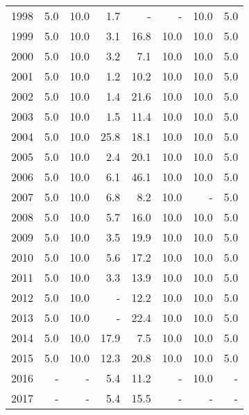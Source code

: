 \begin{longtable}{lrrrrrrr}
  1998 & 5.0 & 10.0 & 1.7 & - & - & 10.0 & 5.0 \\ 
  1999 & 5.0 & 10.0 & 3.1 & 16.8 & 10.0 & 10.0 & 5.0 \\ 
  2000 & 5.0 & 10.0 & 3.2 & 7.1 & 10.0 & 10.0 & 5.0 \\ 
  2001 & 5.0 & 10.0 & 1.2 & 10.2 & 10.0 & 10.0 & 5.0 \\ 
  2002 & 5.0 & 10.0 & 1.4 & 21.6 & 10.0 & 10.0 & 5.0 \\ 
  2003 & 5.0 & 10.0 & 1.5 & 11.4 & 10.0 & 10.0 & 5.0 \\ 
  2004 & 5.0 & 10.0 & 25.8 & 18.1 & 10.0 & 10.0 & 5.0 \\ 
  2005 & 5.0 & 10.0 & 2.4 & 20.1 & 10.0 & 10.0 & 5.0 \\ 
  2006 & 5.0 & 10.0 & 6.1 & 46.1 & 10.0 & 10.0 & 5.0 \\ 
  2007 & 5.0 & 10.0 & 6.8 & 8.2 & 10.0 & - & 5.0 \\ 
  2008 & 5.0 & 10.0 & 5.7 & 16.0 & 10.0 & 10.0 & 5.0 \\ 
  2009 & 5.0 & 10.0 & 3.5 & 19.9 & 10.0 & 10.0 & 5.0 \\ 
  2010 & 5.0 & 10.0 & 5.6 & 17.2 & 10.0 & 10.0 & 5.0 \\ 
  2011 & 5.0 & 10.0 & 3.3 & 13.9 & 10.0 & 10.0 & 5.0 \\ 
  2012 & 5.0 & 10.0 & - & 12.2 & 10.0 & 10.0 & 5.0 \\ 
  2013 & 5.0 & 10.0 & - & 22.4 & 10.0 & 10.0 & 5.0 \\ 
  2014 & 5.0 & 10.0 & 17.9 & 7.5 & 10.0 & 10.0 & 5.0 \\ 
  2015 & 5.0 & 10.0 & 12.3 & 20.8 & 10.0 & 10.0 & 5.0 \\ 
  2016 & - & - & 5.4 & 11.2 & - & 10.0 & - \\ 
  2017 & - & - & 5.4 & 15.5 & - & - & - \\ 
   \hline
\hline
\end{longtable}
\endgroup
